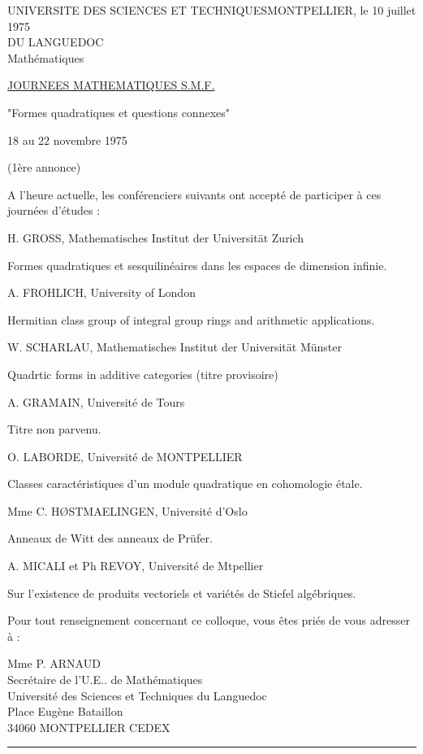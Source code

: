 UNIVERSITE DES SCIENCES ET TECHNIQUES\hfill MONTPELLIER, le 10 juillet 1975\\
DU LANGUEDOC\\
Mathématiques

\uline{JOURNEES MATHEMATIQUES S.M.F.}

"Formes quadratiques et questions connexes"

18 au 22 novembre 1975

(1ère annonce)

A l'heure actuelle, les conférenciers suivants ont accepté de participer à ces journées d'études :

H. GROSS, Mathematisches Institut der Universität Zurich

Formes quadratiques et sesquilinéaires dans les espaces de dimension infinie.

A. FROHLICH, University of London

Hermitian class group of integral group rings and arithmetic applications.

W. SCHARLAU, Mathematisches Institut der Universität Münster

Quadrtic forms in additive categories (titre provisoire)

A. GRAMAIN, Université de Tours

Titre non parvenu.

O. LABORDE, Université de MONTPELLIER

Classes caractéristiques d'un module quadratique en cohomologie étale.

Mme C. HØSTMAELINGEN, Université d'Oslo

Anneaux de Witt des anneaux de Prüfer.

A. MICALI et Ph REVOY, Université de Mtpellier

Sur l'existence de produits vectoriels et variétés de Stiefel algébriques.

Pour tout renseignement concernant ce colloque, vous êtes priés de vous adresser à :

Mme P. ARNAUD\\
Secrétaire de l'U.E.. de Mathématiques\\
Université des Sciences et Techniques du Languedoc\\
Place Eugène Bataillon\\
34060 MONTPELLIER CEDEX

\begin{center}\rule{2.3cm}{0.4pt}\end{center}
